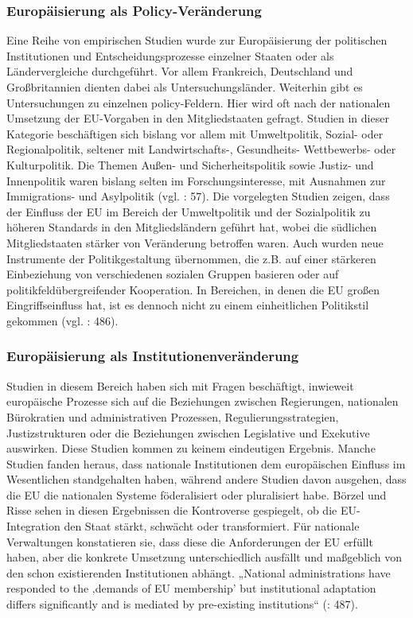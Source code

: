 \subsubsection{Europäisierung als Policy-Veränderung}
Eine Reihe von empirischen Studien wurde zur Europäisierung der politischen Institutionen und Entscheidungsprozesse einzelner Staaten oder als Ländervergleiche durchgeführt. Vor allem Frankreich, Deutschland und Großbritannien dienten dabei als Untersuchungsländer. Weiterhin gibt es Untersuchungen zu einzelnen policy-Feldern. Hier wird oft nach der nationalen Umsetzung der EU-Vorgaben in den Mitgliedstaaten gefragt. Studien in dieser Kategorie beschäftigen sich bislang vor allem mit Umweltpolitik, Sozial- oder Regionalpolitik, seltener mit Landwirtschafts-, Gesundheits- Wettbewerbs- oder Kulturpolitik. Die Themen Außen- und Sicherheitspolitik sowie Justiz- und Innenpolitik waren bislang selten im Forschungsinteresse, mit Ausnahmen zur Immigrations- und Asylpolitik (vgl. \cite{bulmer07}: 57). Die vorgelegten Studien zeigen, dass der Einfluss der EU im Bereich der Umweltpolitik und der Sozialpolitik zu höheren Standards in den Mitgliedsländern geführt hat, wobei die südlichen Mitgliedstaaten stärker von Veränderung betroffen waren. Auch wurden neue Instrumente der Politikgestaltung übernommen, die z.B. auf einer stärkeren Einbeziehung von verschiedenen sozialen Gruppen basieren oder auf politikfeldübergreifender Kooperation. In Bereichen, in denen die EU großen Eingriffseinfluss hat, ist es dennoch nicht zu einem einheitlichen Politikstil gekommen (vgl. \cite{boeris07}: 486).
\subsubsection{Europäisierung als Institutionenveränderung }
Studien in diesem Bereich haben sich mit Fragen beschäftigt, inwieweit europäische Prozesse sich auf die Beziehungen zwischen Regierungen, nationalen Bürokratien und administrativen Prozessen, Regulierungsstrategien, Justizstrukturen oder die Beziehungen zwischen Legislative und Exekutive auswirken. Diese Studien kommen zu keinem eindeutigen Ergebnis. Manche Studien fanden heraus, dass nationale Institutionen dem europäischen Einfluss im Wesentlichen standgehalten haben, während andere Studien davon ausgehen, dass die EU die nationalen Systeme föderalisiert oder pluralisiert habe. Börzel und Risse sehen in diesen Ergebnissen die Kontroverse gespiegelt, ob die EU-Integration den Staat stärkt, schwächt oder transformiert. Für nationale Verwaltungen konstatieren sie, dass diese die Anforderungen der EU erfüllt haben, aber die konkrete Umsetzung unterschiedlich ausfällt und maßgeblich von den schon existierenden Institutionen abhängt. „National administrations have responded to the ‚demands of EU membership’ but institutional adaptation differs significantly and is mediated by pre-existing institutions“ (\cite{boeris07}: 487).
